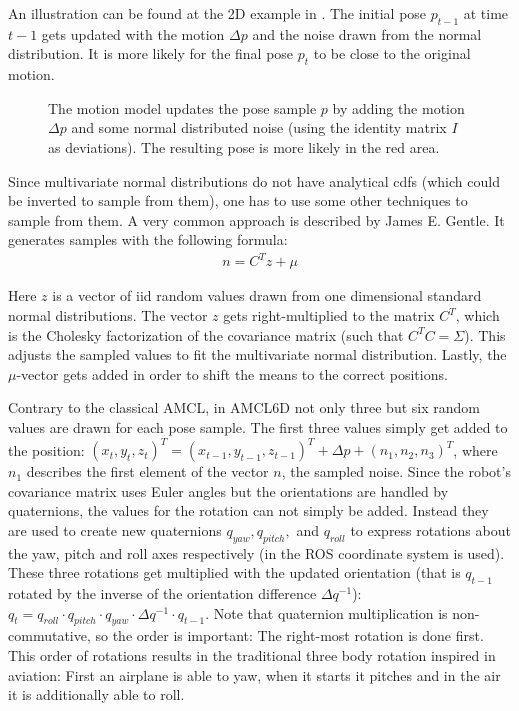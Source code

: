 \documentclass[Thesis.tex]{subfiles}
\begin{document}
An illustration can be found at the 2D example in . The initial pose $p_{t-1}$ at time $t-1$ gets updated with the motion $\Delta p$ and the noise drawn from the normal distribution. It is more likely for the final pose $p_t$ to be close to the original motion.
\begin{figure}[!htp]
  \caption[2D motion model]{The motion model updates the pose sample $p$ by adding the motion $\Delta p$ and some normal distributed noise (using the identity matrix $I$ as deviations). The resulting pose is more likely in the red area.}
  \label{fig:2d_noise_sampling}
\end{figure}
%
Since multivariate normal distributions do not have analytical \glspl{cdf} (which could be inverted to sample from them), one has to use some other techniques to sample from them. A very common approach is described by James E. Gentle\cite{Gentle:2005}. It generates samples with the following formula:
%
\begin{align}
n = C^T z + \mu \label{form:mvndsampling}
\end{align}

Here $z$ is a vector of \gls{iid} random values drawn from one dimensional standard normal distributions. The vector $z$ gets right-multiplied to the matrix $C^T$, which is the Cholesky factorization of the covariance matrix (such that $C^TC = \Sigma$). This adjusts the sampled values to fit the multivariate normal distribution. Lastly, the $\mu$-vector gets added in order to shift the means to the correct positions.

Contrary to the classical \gls{AMCL}, in \gls{AMCL6D} not only three but six random values are drawn for each pose sample. The first three values simply get added to the position: $(x_t, y_t, z_t)^T = (x_{t-1}, y_{t-1}, z_{t-1})^T + \Delta p + (n_1, n_2, n_3)^T$, where $n_1$ describes the first element of the vector $n$, the sampled noise.
Since the robot's covariance matrix uses Euler angles but the orientations are handled by quaternions, the values for the rotation can not simply be added. Instead they are used to create new quaternions $q_{yaw}, q_{pitch},$ and $q_{roll}$ to express rotations about the yaw, pitch and roll axes respectively (in  the \gls{ROS} coordinate system is used). These three rotations get multiplied with the updated orientation (that is $q_{t-1}$ rotated by the inverse of the orientation difference $\Delta q^{-1}$): $q_{t} = q_{roll} \cdot q_{pitch} \cdot q_{yaw} \cdot \Delta q^{-1} \cdot q_{t-1}$. Note that quaternion multiplication is non-commutative, so the order is important: The right-most rotation is done first. This order of rotations results in the traditional three body rotation inspired in aviation: First an airplane is able to yaw, when it starts it pitches and in the air it is additionally able to roll.
\end{document}
